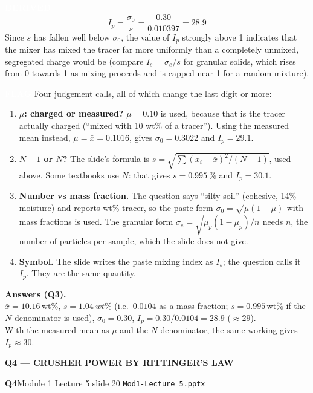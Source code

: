 \documentclass[10pt,a4paper]{article}
\newcommand{\chip}[2]{{\setlength{\fboxsep}{3pt}%
  \colorbox{#1}{\textcolor{white}{\bfseries\footnotesize #2}}}}
\newcommand{\DERIVED}{\chip{devcol}{DERIVED}}
\newcommand{\FLAGTAG}{\chip{flagcol}{FLAG}}
\newcommand{\spsection}[1]{%
  \par\addvspace{10pt}%
  \noindent\begin{tcolorbox}[colback=accent,colframe=accent,boxrule=0pt,arc=1.2pt,
      left=7pt,right=7pt,top=5pt,bottom=5pt,width=\linewidth,before skip=0pt,after skip=7pt]
    \color{white}\bfseries\large #1
  \end{tcolorbox}\par\vspace{-2pt}\nopagebreak}
\newcommand{\spsub}[1]{\par\addvspace{7pt}\noindent{\color{accent}\bfseries #1}\par\addvspace{3pt}\nopagebreak}
\newcommand{\qtitle}[2]{%
  \par\addvspace{9pt}\noindent
  \begin{tcolorbox}[colback=accent2!12,colframe=accent2,boxrule=0.8pt,arc=1.5pt,
      left=7pt,right=7pt,top=4pt,bottom=4pt,before skip=0pt,after skip=4pt,width=\linewidth]
    {\large\bfseries\color{accent}#1}\hfill{\small\color{accent2}#2}
  \end{tcolorbox}\par\vspace{1pt}}
\begin{document}
\spsub{Step 3 --- mixing index}
\begin{devres}
\DERIVED{}
\[
I_p=\frac{\sigma_0}{s}=\frac{0.30}{0.010397}=28.9
\]
Since $s$ has fallen well below $\sigma_0$, the value of $I_p$ strongly above 1 indicates that the
mixer has mixed the tracer far more uniformly than a completely unmixed, segregated charge would be
(compare $I_s=\sigma_e/s$ for granular solids, which rises from 0 towards 1 as mixing proceeds and is
capped near 1 for a random mixture).
\end{devres}

\begin{flagres}
\FLAGTAG{} Four judgement calls, all of which change the last digit or more:
\begin{enumerate}
  \item \textbf{$\mu$: charged or measured?} $\mu=0.10$ is used, because that is the tracer actually
        charged (``mixed with 10 wt\% of a tracer''). Using the measured mean instead,
        $\mu=\bar x=0.1016$, gives $\sigma_0=0.3022$ and $I_p=29.1$.
  \item \textbf{$N-1$ or $N$?} The slide's formula is $s=\sqrt{\sum(x_i-\bar{x})^2/(N-1)}$, used above.
        Some textbooks use $N$: that gives $s=\SI{0.995}{\percent}$ and $I_p=30.1$.
  \item \textbf{Number vs mass fraction.} The question says ``silty soil'' (cohesive, 14\% moisture)
        and reports wt\% tracer, so the paste form $\sigma_0=\sqrt{\mu(1-\mu)}$ with mass fractions is
        used. The granular form $\sigma_e=\sqrt{\mu_p(1-\mu_p)/n}$ needs $n$, the number of particles
        per sample, which the slide does not give.
  \item \textbf{Symbol.} The slide writes the paste mixing index as $I_s$; the question calls it
        $I_p$. They are the same quantity.
\end{enumerate}
\end{flagres}

\begin{ansbox}
\textbf{Answers (Q3).}\\
$\bar x = 10.16$\,wt\%, \quad $s=\SI{1.04}{wt\%}$ (i.e.\ $0.0104$ as a mass fraction; $s=0.995$\,wt\% if
the $N$ denominator is used), \quad $\sigma_0=0.30$, \quad
$I_p=0.30/0.0104=28.9$ \;($\approx 29$).\\
With the measured mean as $\mu$ and the $N$-denominator, the same working gives $I_p\approx30$.
\end{ansbox}

\newpage
\spsection{Q4 --- CRUSHER POWER BY RITTINGER'S LAW}\label{q:4}
\qtitle{Q4}{Module 1 \textperiodcentered{} Lecture 5 \textperiodcentered{} slide 20 \textperiodcentered{} \texttt{Mod1-Lecture 5.pptx}}
\end{document}
